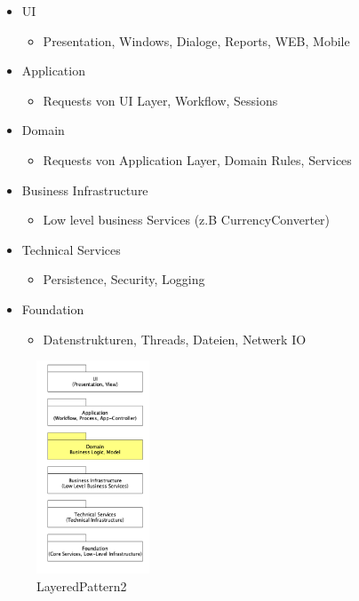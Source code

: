 \documentclass[../ZF_SWEN1.tex]{subfiles}
\begin{document}
\begin{multicols}{2}
	\begin{itemize}
		\item UI
		\begin{itemize}
			\item Presentation, Windows, Dialoge, Reports, WEB, Mobile
		\end{itemize}
		\item Application
		\begin{itemize}
			\item Requests von UI Layer, Workflow, Sessions
		\end{itemize}
		\item Domain
		\begin{itemize}
			\item Requests von Application Layer, Domain Rules, Services
		\end{itemize}
		\item Business Infrastructure
		\begin{itemize}
			\item Low level business Services (z.B CurrencyConverter)
		\end{itemize}
		\item Technical Services
		\begin{itemize}
			\item Persistence, Security, Logging
		\end{itemize}
		\item Foundation
		\begin{itemize}
			\item Datenstrukturen, Threads, Dateien, Netwerk IO
		\end{itemize}
	\end{itemize}
\columnbreak

\begin{figure}[H]			\includegraphics[width=0.3\textwidth] {Resources/Images/LayeredPattern2.png}
\caption{\label{fig:LayeredPattern2}LayeredPattern2}
\end{figure}

\end{multicols}
\end{document}
